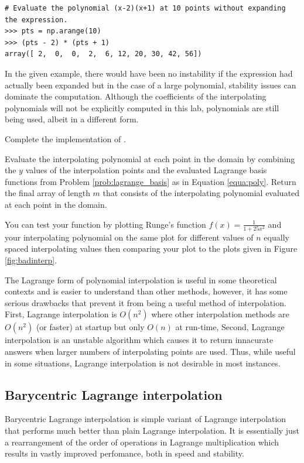 \begin{lstlisting}
# Evaluate the polynomial (x-2)(x+1) at 10 points without expanding the expression.
>>> pts = np.arange(10)
>>> (pts - 2) * (pts + 1)
array([ 2,  0,  0,  2,  6, 12, 20, 30, 42, 56])
\end{lstlisting}
In the given example, there would have been no instability if the expression had actually been expanded but in the case of a large polynomial, stability issues can dominate the computation.
Although the coefficients of the interpolating polynomials will not be explicitly computed in this lab, polynomials are still being used, albeit in a different form.

\begin{problem}

Complete the implementation of . 

Evaluate the interpolating polynomial at each point in the domain by combining the $y$ values of the interpolation points and the evaluated Lagrange basis functions from Problem \ref{prob:lagrange_basis} as in Equation \ref{equa:poly}. 
Return the final array of length $m$ that consists of the interpolating polynomial evaluated at each point in the domain.

You can test your function by plotting Runge's function $f(x)=\frac{1}{1+25x^2}$ and your interpolating polynomial on the same plot for different values of $n$ equally spaced interpolating values then comparing
your plot to the plots given in Figure \ref{fig:badinterp}.
\label{prob:lagrange}
\end{problem}

The Lagrange form of polynomial interpolation is useful in some theoretical contexts and is easier to understand than other methods, however, it has some serious drawbacks that prevent it from being a
useful method of interpolation.
First, Lagrange interpolation is $O(n^2)$ where other interpolation methods are $O(n^2)$ (or faster) at startup but only $O(n)$ at run-time,
Second, Lagrange interpolation is an unstable algorithm which causes it to return innacurate answers when larger numbers of interpolating points are used.
Thus, while useful in some situations, Lagrange interpolation is not desirable in most instances.

\subsection*{Barycentric Lagrange interpolation}
Barycentric Lagrange interpolation is simple variant of Lagrange interpolation that performs much better than plain Lagrange interpolation.
It is essentially just a rearrangement of the order of operations in Lagrange multiplication which results in vastly improved perfomance, both in speed and stability.

